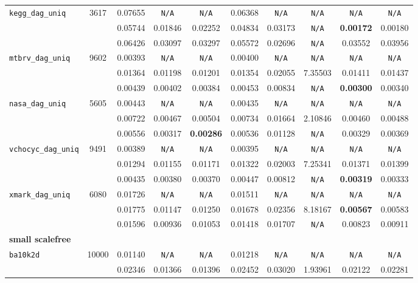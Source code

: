 {\begin{tabular}{ l | c c c c c c c c c }
\hline
\verb|kegg_dag_uniq| & 3617 & 0.07655 & \verb|N/A| & \verb|N/A| & 0.06368 & \verb|N/A| & \verb|N/A| & \verb|N/A| & \verb|N/A| \\
\verb| | &  & 0.05744 & 0.01846 & 0.02252 & 0.04834 & 0.03173 & \verb|N/A| & \textbf{0.00172} & 0.00180 \\
\verb| | &  & 0.06426 & 0.03097 & 0.03297 & 0.05572 & 0.02696 & \verb|N/A| & 0.03552 & 0.03956 \\
\hline
\verb|mtbrv_dag_uniq| & 9602 & 0.00393 & \verb|N/A| & \verb|N/A| & 0.00400 & \verb|N/A| & \verb|N/A| & \verb|N/A| & \verb|N/A| \\
\verb| | &  & 0.01364 & 0.01198 & 0.01201 & 0.01354 & 0.02055 & 7.35503 & 0.01411 & 0.01437 \\
\verb| | &  & 0.00439 & 0.00402 & 0.00384 & 0.00453 & 0.00834 & \verb|N/A| & \textbf{0.00300} & 0.00340 \\
\hline
\verb|nasa_dag_uniq| & 5605 & 0.00443 & \verb|N/A| & \verb|N/A| & 0.00435 & \verb|N/A| & \verb|N/A| & \verb|N/A| & \verb|N/A| \\
\verb| | &  & 0.00722 & 0.00467 & 0.00504 & 0.00734 & 0.01664 & 2.10846 & 0.00460 & 0.00488 \\
\verb| | &  & 0.00556 & 0.00317 & \textbf{0.00286} & 0.00536 & 0.01128 & \verb|N/A| & 0.00329 & 0.00369 \\
\hline
\verb|vchocyc_dag_uniq| & 9491 & 0.00389 & \verb|N/A| & \verb|N/A| & 0.00395 & \verb|N/A| & \verb|N/A| & \verb|N/A| & \verb|N/A| \\
\verb| | &  & 0.01294 & 0.01155 & 0.01171 & 0.01322 & 0.02003 & 7.25341 & 0.01371 & 0.01399 \\
\verb| | &  & 0.00435 & 0.00380 & 0.00370 & 0.00447 & 0.00812 & \verb|N/A| & \textbf{0.00319} & 0.00333 \\
\hline
\verb|xmark_dag_uniq| & 6080 & 0.01726 & \verb|N/A| & \verb|N/A| & 0.01511 & \verb|N/A| & \verb|N/A| & \verb|N/A| & \verb|N/A| \\
\verb| | &  & 0.01775 & 0.01147 & 0.01250 & 0.01678 & 0.02356 & 8.18167 & \textbf{0.00567} & 0.00583 \\
\verb| | &  & 0.01596 & 0.00936 & 0.01053 & 0.01418 & 0.01707 & \verb|N/A| & 0.00823 & 0.00911 \\
\hline
\multicolumn{10}{l}{\textbf{small scalefree}} \\
\hline
\verb|ba10k2d| & 10000 & 0.01140 & \verb|N/A| & \verb|N/A| & 0.01218 & \verb|N/A| & \verb|N/A| & \verb|N/A| & \verb|N/A| \\
\verb| | &  & 0.02346 & 0.01366 & 0.01396 & 0.02452 & 0.03020 & 1.93961 & 0.02122 & 0.02281 \\

\end{tabular}}
